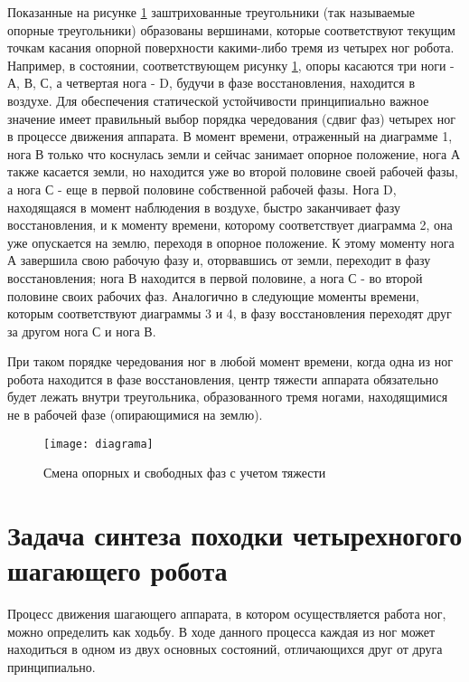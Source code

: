 Показанные на рисунке \ref{diagrama} заштрихованные треугольники (так называемые опорные треугольники) образованы вершинами, которые соответствуют текущим точкам касания опорной поверхности какими-либо тремя из четырех ног робота. Например, в состоянии, соответствующем рисунку \ref{diagrama}, опоры касаются три ноги - А, В, С, а четвертая нога - D, будучи в фазе восстановления, находится в воздухе. Для обеспечения статической устойчивости принципиально важное значение имеет правильный выбор порядка чередования (сдвиг фаз) четырех ног в процессе движения аппарата. В момент времени, отраженный на диаграмме 1, нога В только что коснулась земли и сейчас занимает опорное положение, нога А также касается земли, но находится уже во второй половине своей рабочей фазы, а нога С - еще в первой половине собственной рабочей фазы. Нога D, находящаяся в момент наблюдения в воздухе, быстро заканчивает фазу восстановления, и к моменту времени, которому соответствует диаграмма 2, она уже опускается на землю, переходя в опорное положение. К этому моменту нога А завершила свою рабочую фазу и, оторвавшись от земли, переходит в фазу восстановления; нога В находится в первой половине, а нога С - во второй половине своих рабочих фаз. Аналогично в следующие моменты времени, которым соответствуют диаграммы 3 и 4, в фазу восстановления переходят друг за другом нога С и нога В. 

При таком порядке чередования ног в любой момент времени, когда одна из ног робота находится в фазе восстановления, центр тяжести аппарата обязательно будет лежать внутри треугольника, образованного тремя ногами, находящимися не в рабочей фазе (опирающимися на землю).

\begin{figure}[h!]
	\begin{center}
		\texttt{[image: diagrama]}
		\caption{Смена опорных и свободных фаз с учетом тяжести}
		\label{diagrama}
	\end{center}
\end{figure}
\newpage
\section{Задача синтеза походки четырехногого шагающего робота}\label{C3_1}
Процесс движения шагающего аппарата, в котором осуществляется работа ног, можно определить как ходьбу. В ходе данного процесса каждая из ног может находиться в одном из двух основных состояний, отличающихся друг от друга принципиально.


